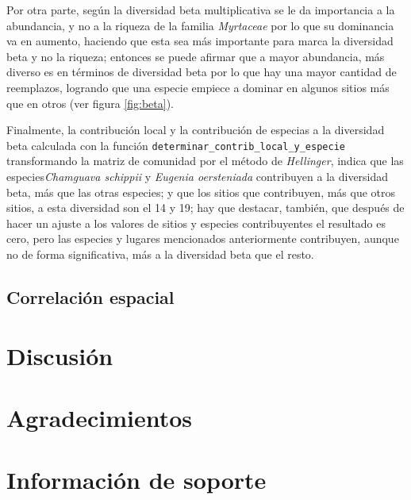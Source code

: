 \documentclass[11pt,]{article}
\begin{document}
Por otra parte, según la diversidad beta multiplicativa se le da
importancia a la abundancia, y no a la riqueza de la familia
\emph{Myrtaceae} por lo que su dominancia va en aumento, haciendo que
esta sea más importante para marca la diversidad beta y no la riqueza;
entonces se puede afirmar que a mayor abundancia, más diverso es en
términos de diversidad beta por lo que hay una mayor cantidad de
reemplazos, logrando que una especie empiece a dominar en algunos sitios
más que en otros (ver figura \ref{fig:beta}).

Finalmente, la contribución local y la contribución de especias a la
diversidad beta calculada con la función
\texttt{determinar\_contrib\_local\_y\_especie} transformando la matriz
de comunidad por el método de \emph{Hellinger}, indica que las
especies\emph{Chamguava schippii} y \emph{Eugenia oersteniada}
contribuyen a la diversidad beta, más que las otras especies; y que los
sitios que contribuyen, más que otros sitios, a esta diversidad son el
14 y 19; hay que destacar, también, que después de hacer un ajuste a los
valores de sitios y especies contribuyentes el resultado es cero, pero
las especies y lugares mencionados anteriormente contribuyen, aunque no
de forma significativa, más a la diversidad beta que el resto.

\subsection{Correlación espacial}\label{correlaciuxf3n-espacial}

\section{Discusión}\label{discusiuxf3n}

\section{Agradecimientos}\label{agradecimientos}

\section{Información de soporte}\label{informaciuxf3n-de-soporte}
\end{document}
